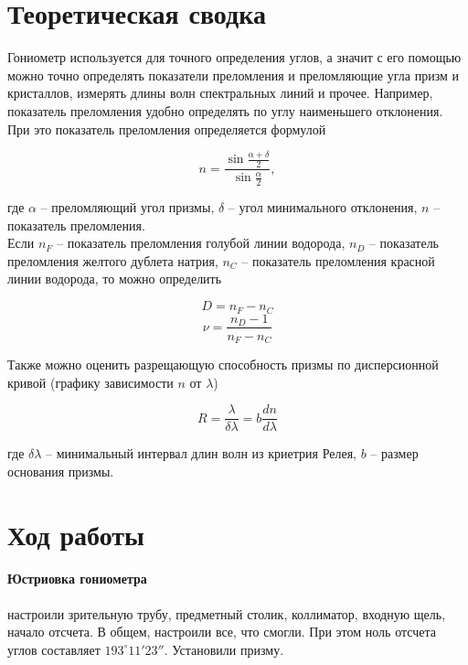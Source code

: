 \documentclass[a4paper,12pt]{article}
\begin{document}
\section*{Теоретическая сводка}
Гониометр используется для точного определения углов, а значит с его помощью можно точно определять показатели преломления и преломляющие угла призм и кристаллов, измерять длины волн спектральных линий и прочее. Например, показатель преломления удобно определять по углу наименьшего отклонения. При это показатель преломления определяется формулой

\begin{equation}
    n = \frac{\sin \frac{\alpha + \delta}{2}}{\sin \frac{\alpha}{2}},
\end{equation}

\noindent
где $\alpha$ -- преломляющий угол призмы, $\delta$ -- угол минимального отклонения, $n$ -- показатель преломления. \\
Если $n_F$ -- показатель преломления голубой линии водорода, $n_D$ -- показатель преломления желтого дублета натрия, $n_C$ -- показатель преломления красной линии водорода, то можно определить

\begin{equation}
    D = n_F - n_C
\end{equation}
\begin{equation}
    \nu = \frac{n_D - 1}{n_F - n_C}
\end{equation}

\noindent
Также можно оценить разрещающую способность призмы по дисперсионной кривой (графику зависимости $n$ от $\lambda$)

\begin{equation}
    R = \frac{\lambda}{\delta\lambda} = b \frac{dn}{d\lambda}
\end{equation}

\noindent
где $\delta\lambda$ -- минимальный интервал длин волн из криетрия Релея, $b$ -- размер основания призмы.

\section*{Ход работы}
\paragraph{Юстриовка гониометра} настроили зрительную трубу, предметный столик, коллиматор, входную щель, начало отсчета. В общем, настроили все, что смогли. При этом ноль отсчета углов составляет $193^\circ11'23''$. Установили призму.
\end{document}
